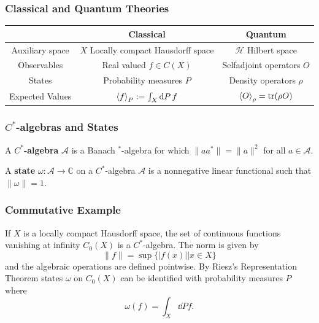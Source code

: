 \documentclass{beamer}
\begin{document}
\begin{frame}
	
	\frametitle{Classical and Quantum Theories}

	\begin{table}
	\begin{tabular}{|c|c|c|}
	\hline
	& Classical & Quantum\\
	\hline
	Auxiliary space & \makecell{$X$ Locally compact \\ Hausdorff space} & $\mathcal{H}$ Hilbert space\\
	\hline
	Observables & Real valued $f\in C(X)$ & Selfadjoint operators $O$\\
	\hline
	States & Probability measures $P$ & Density operators $\rho$ \\
	\hline
	Expected Values & $\ev{f}_P:=\int_X\dd{P}f$ & $\ev{O}_\rho=\tr(\rho O)$\\
	\hline
	\end{tabular}
	\end{table}

\end{frame}

\begin{frame}
	
	\frametitle{$C^*$-algebras and States}
	
	\begin{definition}
		A \textbf{$C^*$-algebra} $\mathcal{A}$ is a Banach ${}^*$-algebra for which $\|aa^*\|=\|a\|^2$ for all $a\in\mathcal{A}$.
	\end{definition}	

	\begin{definition}
		A \textbf{state} $\omega:\mathcal{A}\rightarrow\mathbb{C}$ on a $C^*$-algebra $\mathcal{A}$ is a nonnegative linear functional such that $\|\omega\|=1$. 	
	\end{definition}
	
\end{frame}

\begin{frame}

	\frametitle{Commutative Example}
	
	\begin{Example}
		If $X$ is a locally compact Hausdorff space, the set of continuous functions vanishing at infinity $C_0(X)$ is a $C^*$-algebra. The norm is given by
		\begin{equation}
			\|f\|=\sup\{|f(x)||x\in X\}
		\end{equation}		
and the algebraic operations are defined pointwise. By Riesz's Representation Theorem states $\omega$ on $C_0(X)$ can be identified with probability measures $P$ where
		\begin{equation}
			\omega(f)=\int_X\dd{P}f.
		\end{equation}
	\end{Example}

\end{frame}
\end{document}
